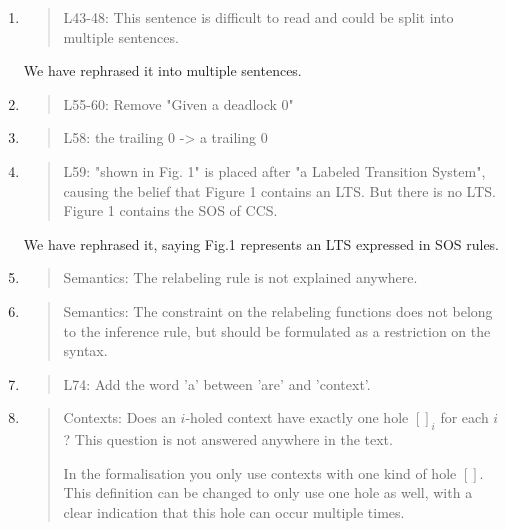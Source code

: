 \begin{enumerate}
\item \begin{quote}
    L43-48: This sentence is difficult to read and could be split into multiple sentences.
  \end{quote}

  We have rephrased it into multiple sentences.
  
\item \begin{quote}
    L55-60: Remove "Given a deadlock 0"
  \end{quote}

\item \begin{quote}
    L58: the trailing 0 -> a trailing 0
  \end{quote}

\item \begin{quote}
    L59: "shown in Fig. 1" is placed after "a Labeled Transition
    System", causing the belief that Figure 1 contains an LTS. 
    But there is no LTS. Figure 1 contains the SOS of CCS.
  \end{quote}

  We have rephrased it, saying Fig.1 represents an LTS expressed in SOS rules.

\item \begin{quote}
    Semantics: The relabeling rule is not explained anywhere.
  \end{quote}

\item \begin{quote}
    Semantics: The constraint on the relabeling functions does not belong to the inference rule, but should be formulated as a restriction on the syntax.
  \end{quote}

\item \begin{quote}
    L74: Add the word 'a' between 'are' and 'context'.
  \end{quote}

\item \begin{quote}
  Contexts: Does an $i$-holed context have exactly one hole $[]_i$ for
  each $i$? This question is not answered anywhere in the text.

  In the formalisation you only use contexts with one kind of hole $[]$. This definition can be changed to only
  use one hole as well, with a clear indication that this hole can occur multiple times.
\end{quote}


\end{enumerate}
